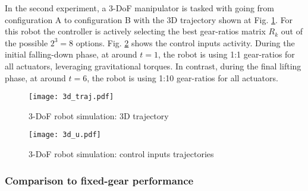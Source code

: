 In the second experiment, a 3-DoF manipulator is tasked with going from configuration A to configuration B with the 3D trajectory shown at Fig. \ref{fig:3d_traj}. For this robot the controller is actively selecting the best gear-ratios matrix $R_k$ out of the possible $2^3=8$ options. Fig. \ref{fig:3d_u} shows the control inputs activity. During the initial falling-down phase, at around $t=1$, the robot is using 1:1 gear-ratios for all actuators, leveraging gravitational torques. In contrast, during the final lifting phase, at around $t=6$, the robot is using 1:10 gear-ratios for all actuators. 
%
%
%
\begin{figure}[htp]
	\centering
		\texttt{[image: 3d\_traj.pdf]}
	\caption{ 3-DoF robot simulation: 3D trajectory }
	\label{fig:3d_traj}
\end{figure}
%
%
\begin{figure}[htp]
	\centering
		\texttt{[image: 3d\_u.pdf]}
	\caption{ 3-DoF robot simulation: control inputs trajectories}
	\label{fig:3d_u}
\end{figure}
%



\subsubsection{Comparison to fixed-gear performance}


